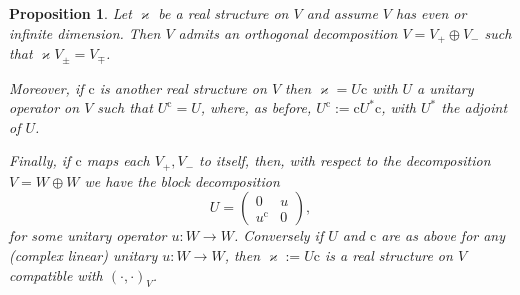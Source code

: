 \documentclass[11pt]{article}
\newcommand{\assign}{:=}
\newcommand{\cdummy}{\cdot}
\newtheorem{proposition}{Proposition}
{\theorembodyfont{\rmfamily}\newtheorem{remark}{Remark}}
\begin{document}
\begin{proposition}
  \label{GPpro:orthogonal-dec}Let $\varkappa$ be a real structure on $V$ and
  assume $V$ has even or infinite dimension. Then $V$ admits an orthogonal
  decomposition $V = V_+ \oplus V_-$ such that $\varkappa V_{\pm} = V_{\mp}$.
  
  Moreover, if $\mathrm{c}$ is another real structure on $V$ then $\varkappa =
  U\mathrm{c}$ with $U$ a unitary operator on $V$ such that $U^{\mathrm{c}} =
  U$, where, as before, $U^{\mathrm{c}} \assign \mathrm{c}U^{\ast}
  \mathrm{c}$, with $U^{\ast}$ the adjoint of $U$.
  
  Finally, if $\mathrm{c}$ maps each $V_+, V_-$ to itself, then, with respect
  to the decomposition $V = W \oplus W$ we have the block decomposition
  \begin{equation}
    U = \left( \begin{array}{cc}
      0 & u\\
      u^{\mathrm{c}} & 0
    \end{array} \right) \label{GPeq:UsDecomposition},
  \end{equation}
  for some unitary operator $u : W \rightarrow W$. Conversely if $U$ and
  $\mathrm{c}$ are as above for any (complex linear) unitary $u : W
  \rightarrow W$, then $\varkappa \assign U\mathrm{c}$ is a real structure on
  $V$ compatible with $(\cdummy, \cdummy)_V$.
\end{proposition}
\end{document}
